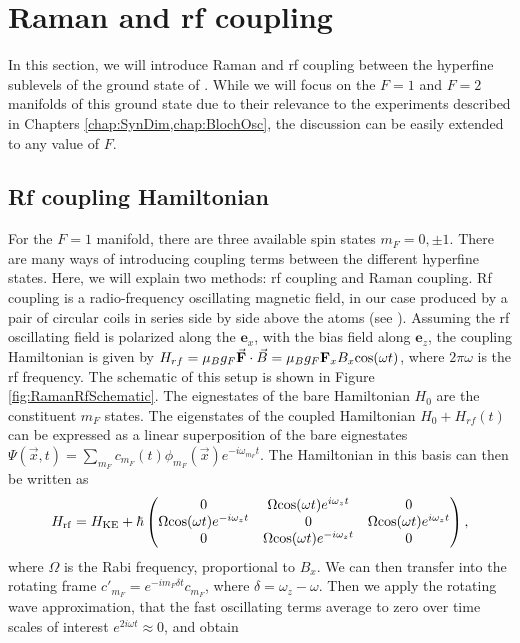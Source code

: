\section{Raman and rf coupling}\label{chap:4sec:rf}

In this section, we will introduce Raman and rf coupling between the hyperfine sublevels of the ground state of \Rb{}. While we will focus on the $F=1$ and $F=2$ manifolds of this ground state due to their relevance to the experiments described in Chapters \ref{chap:SynDim,chap:BlochOsc}, the discussion can be easily extended to any value of $F$. 

\subsection{Rf coupling Hamiltonian}

	For the $F=1$ manifold, there are three available spin states $m_F = 0,\pm1$. There are many ways of introducing coupling terms between the different hyperfine states. Here, we will explain two methods: rf coupling and Raman coupling. Rf coupling is a radio-frequency oscillating magnetic field, in our case produced by a pair of circular coils in series side by side above the atoms (see \cite{KarinaThesis}). Assuming the rf oscillating field is polarized along the $\mathbf{e}_x$, with the bias field along $\mathbf{e}_z$, the coupling Hamiltonian is given by $H_{rf} = \mu_B g_F \vec{\mathbf{F}}\cdot{}\vec{B} = \mu_B g_F \mathbf{F}_x B_x {\rm cos}(\omega t)$, where $2 \pi\omega$ is the rf frequency. The schematic of this setup is shown in Figure \ref{fig:RamanRfSchematic}.
	The eignestates of the bare Hamiltonian $H_0$ are the constituent $m_F$ states. The eigenstates of the coupled Hamiltonian $H_0 + H_{rf}(t)$ can be expressed as a linear superposition of the bare eignestates $\Psi(\vec{x},t)=\sum_{m_F}c_{m_F}(t)\phi_{m_F}(\vec{x})e^{-i\omega_{m_F}t}$. The Hamiltonian in this basis can then be written as\cite{LCT}
\begin{equation}
H_{\rm rf} = H_{\rm KE} + \hbar
 \begin{pmatrix} 0 & \Omega {\rm cos}(\omega t)e^{i\omega_zt}  & 0  \\ 
\Omega {\rm cos}(\omega t)e^{-i\omega_zt}  & 0 &  \Omega {\rm cos}(\omega t)e^{i\omega_zt} \\
 0 & \Omega {\rm cos}(\omega t)e^{-i\omega_zt}  & 0  \\
 \end{pmatrix} \\,
\end{equation}
where $\Omega$ is the Rabi frequency, proportional to $B_x$.
	 We can then transfer into the rotating frame $c'_{m_F} = e^{-i m_F \delta t}c_{m_F}$, where $\delta = \omega_z - \omega$. Then we apply the rotating wave approximation, that the fast oscillating terms average to zero over time scales of interest $e^{2i\omega t}\approx 0$, and obtain 

